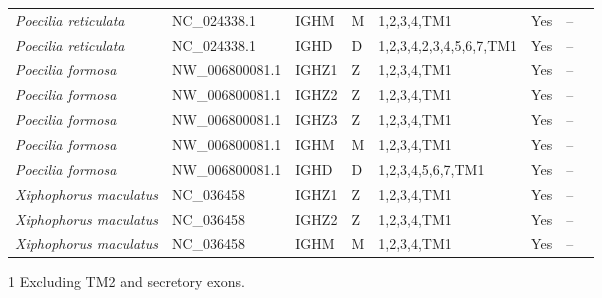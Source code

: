 \begin{landscape}
\begin{threeparttable}
\begin{tabular}{>{\itshape}lllllllp{4cm}}
  Poecilia reticulata & NC\_024338.1 & IGHM & M & 1,2,3,4,TM1 & Yes & -- &  \\ 
  Poecilia reticulata & NC\_024338.1 & IGHD & D & 1,2,3,4,2,3,4,5,6,7,TM1 & Yes & -- &  \\ 
  Poecilia formosa & NW\_006800081.1 & IGHZ1 & Z & 1,2,3,4,TM1 & Yes & -- &  \\ 
  Poecilia formosa & NW\_006800081.1 & IGHZ2 & Z & 1,2,3,4,TM1 & Yes & -- &  \\ 
  Poecilia formosa & NW\_006800081.1 & IGHZ3 & Z & 1,2,3,4,TM1 & Yes & -- &  \\ 
  Poecilia formosa & NW\_006800081.1 & IGHM & M & 1,2,3,4,TM1 & Yes & -- &  \\ 
  Poecilia formosa & NW\_006800081.1 & IGHD & D & 1,2,3,4,5,6,7,TM1 & Yes & -- &  \\ 
  Xiphophorus maculatus & NC\_036458 & IGHZ1 & Z & 1,2,3,4,TM1 & Yes & -- &  \\ 
  Xiphophorus maculatus & NC\_036458 & IGHZ2 & Z & 1,2,3,4,TM1 & Yes & -- &  \\ 
  Xiphophorus maculatus & NC\_036458 & IGHM & M & 1,2,3,4,TM1 & Yes & -- &  \\ 
   \bottomrule \end{tabular}
	\begin{tablenotes}
	\item[1] Excluding TM2 and secretory exons.
	\end{tablenotes}
	\end{threeparttable}
	\normalsize\vspace{1em}
	\label{tab:multispecies-ch-regions-2}
    \vspace*{\fill}
    \end{landscape}

